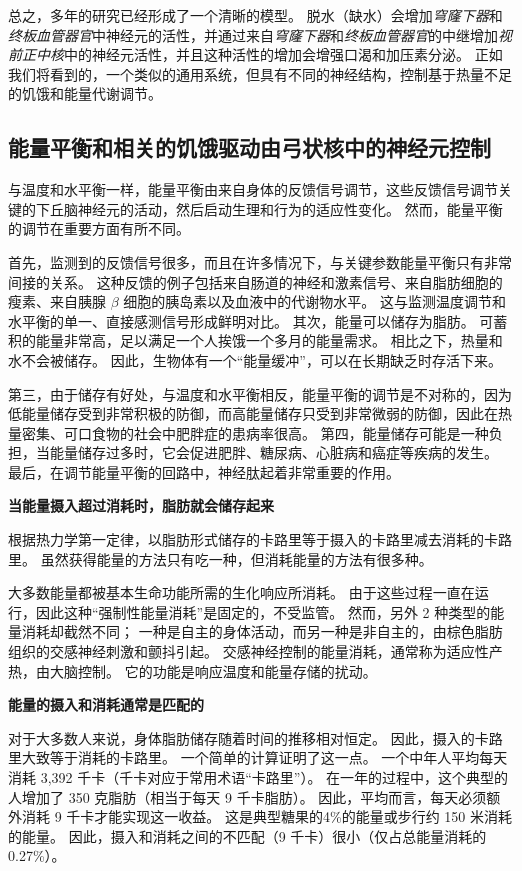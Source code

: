 总之，多年的研究已经形成了一个清晰的模型。
脱水（缺水）会增加\textit{穹窿下器}和\textit{终板血管器官}中神经元的活性，并通过来自\textit{穹窿下器}和\textit{终板血管器官}的中继增加\textit{视前正中核}中的神经元活性，并且这种活性的增加会增强口渴和加压素分泌。
正如我们将看到的，一个类似的通用系统，但具有不同的神经结构，控制基于热量不足的饥饿和能量代谢调节。



\subsection{能量平衡和相关的饥饿驱动由弓状核中的神经元控制}

与温度和水平衡一样，能量平衡由来自身体的反馈信号调节，这些反馈信号调节关键的下丘脑神经元的活动，然后启动生理和行为的适应性变化。
然而，能量平衡的调节在重要方面有所不同。


首先，监测到的反馈信号很多，而且在许多情况下，与关键参数能量平衡只有非常间接的关系。
这种反馈的例子包括来自肠道的神经和激素信号、来自脂肪细胞的瘦素、来自胰腺 $ \beta $ 细胞的胰岛素以及血液中的代谢物水平。
这与监测温度调节和水平衡的单一、直接感测信号形成鲜明对比。
其次，能量可以储存为脂肪。
可蓄积的能量非常高，足以满足一个人挨饿一个多月的能量需求。
相比之下，热量和水不会被储存。
因此，生物体有一个“能量缓冲”，可以在长期缺乏时存活下来。


第三，由于储存有好处，与温度和水平衡相反，能量平衡的调节是不对称的，因为低能量储存受到非常积极的防御，而高能量储存只受到非常微弱的防御，因此在热量密集、可口食物的社会中肥胖症的患病率很高。
第四，能量储存可能是一种负担，当能量储存过多时，它会促进肥胖、糖尿病、心脏病和癌症等疾病的发生。
最后，在调节能量平衡的回路中，神经肽起着非常重要的作用。


\textbf{当能量摄入超过消耗时，脂肪就会储存起来}

根据热力学第一定律，以脂肪形式储存的卡路里等于摄入的卡路里减去消耗的卡路里。
虽然获得能量的方法只有吃一种，但消耗能量的方法有很多种。


大多数能量都被基本生命功能所需的生化响应所消耗。
由于这些过程一直在运行，因此这种“强制性能量消耗”是固定的，不受监管。
然而，另外 2 种类型的能量消耗却截然不同；
一种是自主的身体活动，而另一种是非自主的，由棕色脂肪组织的交感神经刺激和颤抖引起。
交感神经控制的能量消耗，通常称为适应性产热，由大脑控制。
它的功能是响应温度和能量存储的扰动。


\textbf{能量的摄入和消耗通常是匹配的}

对于大多数人来说，身体脂肪储存随着时间的推移相对恒定。
因此，摄入的卡路里大致等于消耗的卡路里。
一个简单的计算证明了这一点。
一个中年人平均每天消耗 3,392 千卡（千卡对应于常用术语“卡路里”）。
在一年的过程中，这个典型的人增加了 350 克脂肪（相当于每天 9 千卡脂肪）。
因此，平均而言，每天必须额外消耗 9 千卡才能实现这一收益。
这是典型糖果的4\%的能量或步行约 150 米消耗的能量。
因此，摄入和消耗之间的不匹配（9 千卡）很小（仅占总能量消耗的 0.27\%）。


